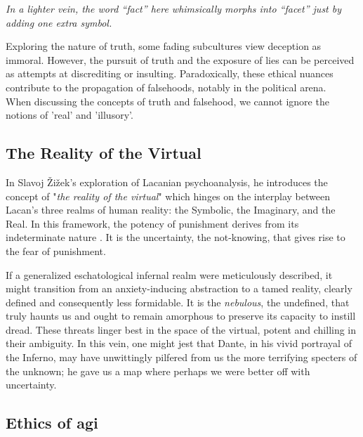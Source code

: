 \documentclass[11pt,a4]{article}
\begin{document}
\textit{In a lighter vein, the word “fact” here whimsically morphs into “facet” just by adding one extra symbol.
} \\
\par

Exploring the nature of truth, some fading subcultures view deception as immoral. However, the pursuit of truth and the exposure of lies can be perceived as attempts at discrediting or insulting. Paradoxically, these ethical nuances contribute to the propagation of falsehoods, notably in the political arena.\\

When discussing the concepts of truth and falsehood, we cannot ignore the notions of 'real' and 'illusory'.

    \subsection{The Reality of the Virtual}

        In Slavoj Žižek's exploration of Lacanian psychoanalysis, he introduces the concept of "\textit{the reality of the virtual}" which hinges on the interplay between Lacan's three realms of human reality: the Symbolic, the Imaginary, and the Real.
        In this framework, the potency of punishment derives from its indeterminate nature \cite{Borretzen2012-tx}. It is the uncertainty, the not-knowing, that gives rise to the fear of punishment.

        \par
        If a generalized eschatological infernal realm were meticulously described, it might transition from an anxiety-inducing abstraction to a tamed reality, clearly defined and consequently less formidable. It is the \textit{nebulous}, the undefined, that truly haunts us and ought to remain amorphous to preserve its capacity to instill dread. These threats linger best in the space of the virtual, potent and chilling in their ambiguity. In this vein, one might jest that Dante, in his vivid portrayal of the Inferno, may have unwittingly pilfered from us the more terrifying specters of the unknown; he gave us a map where perhaps we were better off with uncertainty.













\subsection{Ethics of \acrshort{agi} }
\end{document}
